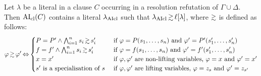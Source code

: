 \documentclass[,%
	draft=false,%
	numbers=noendperiod
	oneside,openany
	a4paper,
	11pt,
]{memoir}
\begin{document}
\begin{lemma}
	Let $\lambda$ be a literal in a clause $C$ occurring in a resolution refutation of $\Gamma\cup\Delta$.
	Then $\operatorname{AI}_\mathrm{cl}(C)$ contains a literal $\lambda_{\operatorname{AIcl}}$ such that $\lambda\cl \simgeq \lifboth{\lambda}$, where $\simgeq$ is defined as follows:
	\[
		\varphi \simgeq \varphi' \semiff
		\begin{cases}
			P = P' \land \bigwedge_{i=1}^n s_i \simgeq s'_i &  \text{ if $\varphi = P(s_1, \dots, s_n)$ and $\varphi' = P'(s'_1, \dots, s'_n)$} \\
			f = f' \land \bigwedge_{i=1}^n s_i \simgeq s'_i &  \text{ if $\varphi = f(s_1, \dots, s_n)$ and $\varphi' = f'(s'_1, \dots, s'_n)$} \\
			x = x' & \text{ if $\varphi, \varphi'$ are non-lifting variables, $\varphi = x$ and $\varphi' = x'$} \\
			s' \text{ is a specialisation of } s  & \text{ if $\varphi, \varphi'$ are lifting variables, $\varphi = z_s$ and $\varphi' = z_{s'}$} \\
		\end{cases}
	\]
\end{lemma}
\end{document}
